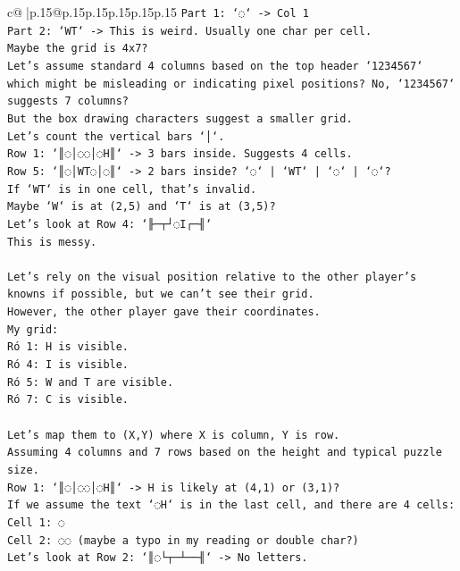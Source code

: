 \documentclass{article}
\begin{document}
{\begin{supertabular}{c@{$\;$}|p{.15\linewidth}@{}p{.15\linewidth}p{.15\linewidth}p{.15\linewidth}p{.15\linewidth}p{.15\linewidth}}
{{{\texttt{Part 1: `◌` {-}> Col 1} \\
\texttt{Part 2: `WT` {-}> This is weird. Usually one char per cell.} \\
\texttt{Maybe the grid is 4x7?} \\
\texttt{Let's assume standard 4 columns based on the top header `1234567` which might be misleading or indicating pixel positions? No, `1234567` suggests 7 columns?} \\
\texttt{But the box drawing characters suggest a smaller grid.} \\
\texttt{Let's count the vertical bars `│`.} \\
\texttt{Row 1: `║◌│◌◌│◌H║` {-}> 3 bars inside. Suggests 4 cells.} \\
\texttt{Row 5: `║◌│WT◌│◌║` {-}> 2 bars inside? `◌` | `WT` | `◌` | `◌`?} \\
\texttt{If `WT` is in one cell, that's invalid.} \\
\texttt{Maybe `W` is at (2,5) and `T` is at (3,5)?} \\
\texttt{Let's look at Row 4: `╟─┬┘◌I┌─╢`} \\
\texttt{This is messy.} \\
\\ 
\texttt{Let's rely on the visual position relative to the other player's knowns if possible, but we can't see their grid.} \\
\texttt{However, the other player gave their coordinates.} \\
\texttt{My grid:} \\
\texttt{Ró 1: H is visible.} \\
\texttt{Ró 4: I is visible.} \\
\texttt{Ró 5: W and T are visible.} \\
\texttt{Ró 7: C is visible.} \\
\\ 
\texttt{Let's map them to (X,Y) where X is column, Y is row.} \\
\texttt{Assuming 4 columns and 7 rows based on the height and typical puzzle size.} \\
\texttt{Row 1: `║◌│◌◌│◌H║` {-}> H is likely at (4,1) or (3,1)?} \\
\texttt{If we assume the text `◌H` is in the last cell, and there are 4 cells:} \\
\texttt{Cell 1: ◌} \\
\texttt{Cell 2: ◌◌ (maybe a typo in my reading or double char?)} \\
\texttt{Let's look at Row 2: `║◌└┬─┴──╢` {-}> No letters.} \\
}}}
\end{supertabular}}
\end{document}
